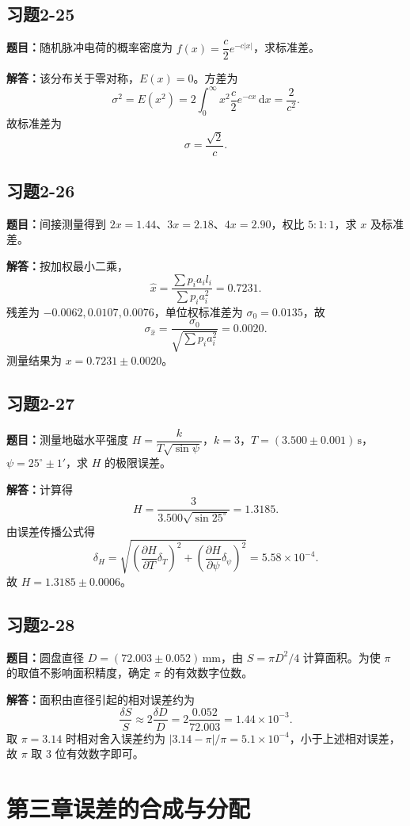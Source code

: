 \documentclass[UTF8,zihao=-4]{ctexart}
\newcommand{\problem}[1]{\subsection*{#1}}
\newcommand{\timu}{\noindent\textbf{题目：}}
\newcommand{\jieda}{\noindent\textbf{解答：}}
\begin{document}
{\problem{习题2-25}
\timu 随机脉冲电荷的概率密度为 $f(x)=\dfrac{c}{2}e^{-c|x|}$，求标准差。

\jieda 该分布关于零对称，$E(x)=0$。方差为
\begin{equation*}
    \sigma^2=E(x^2)=2\int_0^\infty x^2\frac{c}{2}e^{-cx}\,\mathrm{d}x=\frac{2}{c^2}.
\end{equation*}
故标准差为
\begin{equation*}
    \sigma=\frac{\sqrt{2}}{c}.
\end{equation*}

\problem{习题2-26}
\timu 间接测量得到 $2x=1.44$、$3x=2.18$、$4x=2.90$，权比 $5:1:1$，求 $x$ 及标准差。

\jieda 按加权最小二乘，
\begin{equation*}
    \hat{x}=\frac{\sum p_i a_i l_i}{\sum p_i a_i^2}=0.7231.
\end{equation*}
残差为 $-0.0062,0.0107,0.0076$，单位权标准差为 $\sigma_0=0.0135$，故
\begin{equation*}
    \sigma_{\hat{x}}=\frac{\sigma_0}{\sqrt{\sum p_i a_i^2}}=0.0020.
\end{equation*}
测量结果为 $x=0.7231\pm0.0020$。

\problem{习题2-27}
\timu 测量地磁水平强度 $H=\dfrac{k}{T\sqrt{\sin\psi}}$，$k=3$，$T=(3.500\pm0.001)\,\mathrm{s}$，$\psi=25^\circ\pm1'$，求 $H$ 的极限误差。

\jieda 计算得
\begin{equation*}
    H=\frac{3}{3.500\sqrt{\sin25^\circ}}=1.3185.
\end{equation*}
由误差传播公式得
\begin{equation*}
    \delta_H=\sqrt{\left(\frac{\partial H}{\partial T}\delta_T\right)^2+
    \left(\frac{\partial H}{\partial\psi}\delta_\psi\right)^2}=5.58\times10^{-4}.
\end{equation*}
故 $H=1.3185\pm0.0006$。

\problem{习题2-28}
\timu 圆盘直径 $D=(72.003\pm0.052)\,\mathrm{mm}$，由 $S=\pi D^2/4$ 计算面积。为使 $\pi$ 的取值不影响面积精度，确定 $\pi$ 的有效数字位数。

\jieda 面积由直径引起的相对误差约为
\begin{equation*}
    \frac{\delta S}{S}\approx2\frac{\delta D}{D}=2\frac{0.052}{72.003}=1.44\times10^{-3}.
\end{equation*}
取 $\pi=3.14$ 时相对舍入误差约为 $|3.14-\pi|/\pi=5.1\times10^{-4}$，小于上述相对误差，故 $\pi$ 取 $3$ 位有效数字即可。

\section*{第三章\quad 误差的合成与分配}

}
\end{document}
